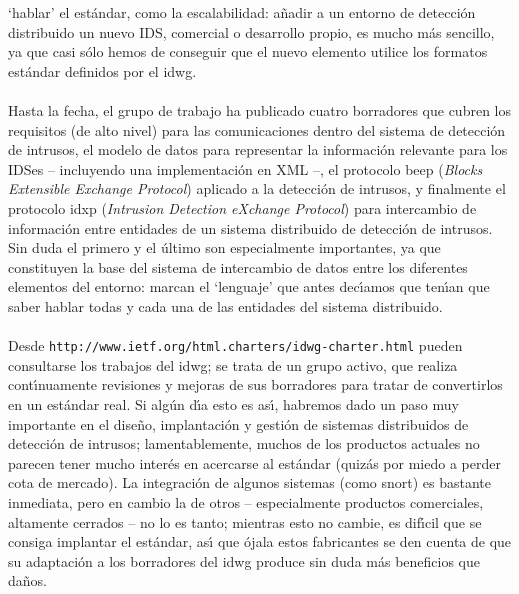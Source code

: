 `hablar' el est\'andar, como la escalabilidad: a\~nadir a un entorno de 
detecci\'on distribuido un nuevo IDS, comercial o desarrollo propio, es mucho
m\'as sencillo, ya que casi s\'olo hemos de conseguir que el nuevo elemento 
utilice los formatos est\'andar definidos por el {\sc idwg}.\\
\\Hasta la fecha, el grupo de trabajo ha publicado cuatro borradores que cubren
los requisitos (de alto nivel) para las comunicaciones dentro del sistema de
detecci\'on de intrusos, el modelo de datos para representar la informaci\'on
relevante para los IDSes -- incluyendo una implementaci\'on en XML --, el 
protocolo {\sc beep} ({\it Blocks Extensible Exchange Protocol}) aplicado a la
detecci\'on de intrusos, y finalmente el protocolo {\sc idxp} ({\it Intrusion
Detection eXchange Protocol}) para intercambio de informaci\'on entre entidades
de un sistema distribuido de detecci\'on de intrusos. Sin duda el primero y
el \'ultimo son especialmente importantes, ya que constituyen la base del
sistema de intercambio de datos entre los diferentes elementos del entorno: 
marcan el `lenguaje' que antes dec\'{\i}amos que ten\'{\i}an que saber hablar
todas y cada una de las entidades del sistema distribuido.\\
\\Desde {\tt http://www.ietf.org/html.charters/idwg-charter.html} pueden 
consultarse los trabajos del {\sc idwg}; se trata de un grupo activo, que 
realiza cont\'{\i}nuamente revisiones y mejoras de sus borradores para tratar 
de convertirlos en un est\'andar real. Si alg\'un d\'{\i}a esto es as\'{\i},
habremos dado un paso muy importante en el dise\~no, implantaci\'on y gesti\'on
de sistemas distribuidos de detecci\'on de intrusos; lamentablemente, muchos
de los productos actuales no parecen tener mucho inter\'es en acercarse al
est\'andar (quiz\'as por miedo a perder cota de mercado). La integraci\'on de
algunos sistemas (como {\sc snort}) es bastante inmediata, pero en cambio la
de otros -- especialmente productos comerciales, altamente cerrados -- no lo
es tanto; mientras esto no cambie, es dif\'{\i}cil que se consiga implantar el
est\'andar, as\'{\i} que \'ojala estos fabricantes se den cuenta de que su 
adaptaci\'on a los borradores del {\sc idwg} produce sin duda m\'as beneficios
que da\~nos.
